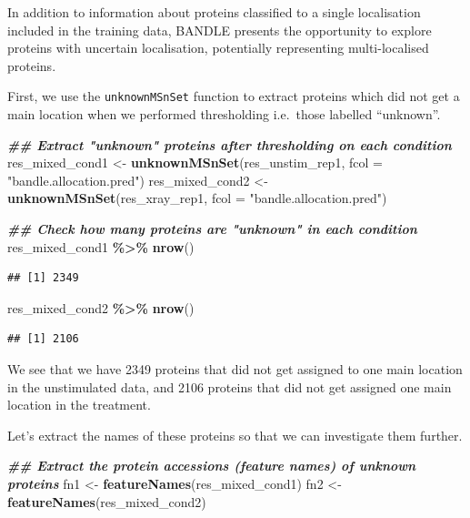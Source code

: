 \documentclass[9pt,a4paper,]{extarticle}
\newenvironment{Shaded}{\begin{snugshade}}{\end{snugshade}}
\newcommand{\AttributeTok}[1]{\textcolor[rgb]{0.13,0.29,0.53}{#1}}
\newcommand{\DocumentationTok}[1]{\textcolor[rgb]{0.56,0.35,0.01}{\textbf{\textit{#1}}}}
\newcommand{\FunctionTok}[1]{\textcolor[rgb]{0.13,0.29,0.53}{\textbf{#1}}}
\newcommand{\NormalTok}[1]{#1}
\newcommand{\OtherTok}[1]{\textcolor[rgb]{0.56,0.35,0.01}{#1}}
\newcommand{\SpecialCharTok}[1]{\textcolor[rgb]{0.81,0.36,0.00}{\textbf{#1}}}
\newcommand{\StringTok}[1]{\textcolor[rgb]{0.31,0.60,0.02}{#1}}
\begin{document}
In addition to information about proteins classified to a single localisation
included in the training data, BANDLE presents the opportunity to explore proteins
with uncertain localisation, potentially representing multi-localised proteins.

First, we use the \texttt{unknownMSnSet} function to extract proteins which did
not get a main location when we performed thresholding i.e.~those labelled
``unknown''.

\begin{Shaded}
\begin{Highlighting}[]
\DocumentationTok{\#\# Extract "unknown" proteins after thresholding on each condition}
\NormalTok{res\_mixed\_cond1 }\OtherTok{\textless{}{-}} \FunctionTok{unknownMSnSet}\NormalTok{(res\_unstim\_rep1, }\AttributeTok{fcol =} \StringTok{"bandle.allocation.pred"}\NormalTok{)}
\NormalTok{res\_mixed\_cond2 }\OtherTok{\textless{}{-}} \FunctionTok{unknownMSnSet}\NormalTok{(res\_xray\_rep1, }\AttributeTok{fcol =} \StringTok{"bandle.allocation.pred"}\NormalTok{)}

\DocumentationTok{\#\# Check how many proteins are "unknown" in each condition}
\NormalTok{res\_mixed\_cond1 }\SpecialCharTok{\%\textgreater{}\%} \FunctionTok{nrow}\NormalTok{()}
\end{Highlighting}
\end{Shaded}

\begin{verbatim}
## [1] 2349
\end{verbatim}

\begin{Shaded}
\begin{Highlighting}[]
\NormalTok{res\_mixed\_cond2 }\SpecialCharTok{\%\textgreater{}\%} \FunctionTok{nrow}\NormalTok{()}
\end{Highlighting}
\end{Shaded}

\begin{verbatim}
## [1] 2106
\end{verbatim}

We see that we have 2349 proteins that did not get assigned
to one main location in the unstimulated data, and 2106
proteins that did not get assigned one main location in the treatment.

Let's extract the names of these proteins so that we can investigate them further.

\begin{Shaded}
\begin{Highlighting}[]
\DocumentationTok{\#\# Extract the protein accessions (feature names) of unknown proteins}
\NormalTok{fn1 }\OtherTok{\textless{}{-}} \FunctionTok{featureNames}\NormalTok{(res\_mixed\_cond1)}
\NormalTok{fn2 }\OtherTok{\textless{}{-}} \FunctionTok{featureNames}\NormalTok{(res\_mixed\_cond2)}
\end{Highlighting}
\end{Shaded}
\end{document}
